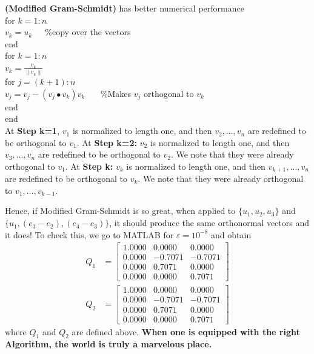 \begin{definition} \textbf{(Modified Gram-Schmidt)} has better numerical performance\\
for $k=1:n$\\
        \indent\hspace{4ex}$v_k=u_k$~~~\%copy over the vectors\\
        end \bigskip\\
        for $k=1:n$\\
        \indent\hspace{4ex}$v_k=\frac{v_k}{\|v_k\|}$ \medskip\\
        \indent\hspace{4ex}for $j=(k+1):n$  \medskip\\
        \indent\hspace{8ex}$v_j=v_j-(v_j \bullet v_k)v_k$  ~~~\%Makes $v_j$ orthogonal to  $v_k$\\
        \indent\hspace{4ex}end\\
        end\\
        At \textbf{Step k=1}, $v_1$ is normalized to length one, and then $v_2, \ldots, v_n$ are redefined to be orthogonal to $v_1$. At \textbf{Step k=2:}  $v_2$ is normalized to length one, and then $v_3, \ldots, v_n$ are redefined to be orthogonal to $v_2$. We note that they were already orthogonal to $v_1$.  At \textbf{Step k:}  $v_k$ is normalized to length one, and then $v_{k+1}, \ldots, v_n$ are redefined to be orthogonal to $v_k$. We note that they were already orthogonal to $v_1, \ldots, v_{k-1}$.    
\end{definition}
 
        
 \begin{example}
Hence, if Modified Gram-Schmidt is so great, when applied to $\{u_1,u_2,u_3\}$ and $\{u_1,(e_3-e_2),(e_4-e_3)\}$, it should produce the same orthonormal vectors and it does! To check this, we go to MATLAB for $\varepsilon=10^{-8}$ and obtain
\begin{align*}
    Q_1 &= \left[ \begin{array}{rrr}
  1.0000     &    0.0000     &  0.0000  \\
    0.0000 &  -0.7071  & -0.7071 \\
        0.0000  &   0.7071   &      0.0000  \\
        0.0000   &      0.0000  &  0.7071
    \end{array} \right] \\
    Q_2&=\left[ \begin{array}{rrr}
  1.0000     &    0.0000     &  0.0000  \\
    0.0000 &  -0.7071  & -0.7071 \\
        0.0000  &   0.7071   &      0.0000  \\
        0.0000   &      0.0000  &  0.7071
    \end{array} \right]
    \end{align*}
where $Q_1$ and $Q_2$ are defined above. \textbf{When one is equipped with the right Algorithm, the world is truly a marvelous place.}
  
  \end{example}
  
